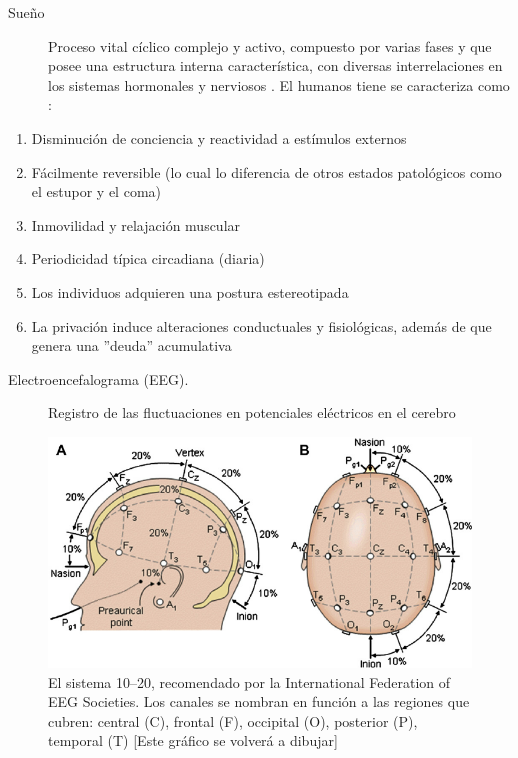 \documentclass{beamer}
\theoremstyle{definition}
\begin{document}
\begin{frame}
\begin{description}
\item[Sue\~no] Proceso vital c\'iclico complejo y activo, compuesto por varias fases y que posee 
una estructura interna caracter\'istica, con diversas interrelaciones en los sistemas hormonales y 
nerviosos \cite{FernandezConde07}.
El humanos tiene se caracteriza como \cite{CarrilloMora}:
\end{description}
\begin{enumerate}
\item Disminuci\'on de conciencia y reactividad a est\'imulos externos
\item F\'acilmente reversible (lo cual lo diferencia de otros estados 
patol\'ogicos como el estupor y el coma)
\item Inmovilidad y relajaci\'on muscular
\item Periodicidad t\'ipica circadiana (diaria)
\item Los individuos adquieren una postura estereotipada
\item La privaci\'on induce alteraciones conductuales y 
fisiol\'ogicas, adem\'as de que genera una ''deuda'' acumulativa
\end{enumerate}
\end{frame}

\begin{frame}
\begin{description}
\item[Electroencefalograma (EEG).] Registro de las fluctuaciones en potenciales el\'ectricos en el 
cerebro
\end{description}
\begin{figure}
\centering
\includegraphics[width=0.6\linewidth]{Fig.png} 
\caption{El sistema 10--20, recomendado por la
International Federation of EEG Societies. Los canales se nombran en funci\'on a las regiones
que cubren: central (C), frontal (F), occipital (O), posterior (P), temporal (T) [Este gr\'afico se volver\'a a dibujar]
}
\label{img1020}
\end{figure}
\end{frame}
\end{document}
